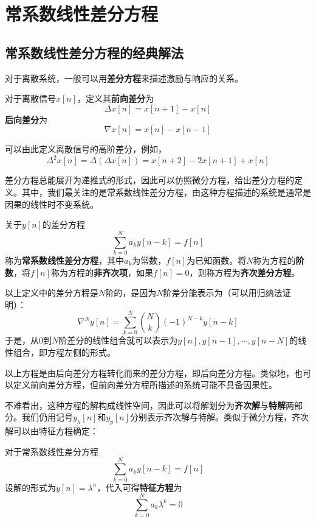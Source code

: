 \section{常系数线性差分方程}

\subsection{常系数线性差分方程的经典解法}\label{sub:difference_equation}

对于离散系统，一般可以用\textbf{差分方程}来描述激励与响应的关系。

\begin{definition}[差分]
    对于离散信号$x[n]$，定义其\textbf{前向差分}为
    $$\Delta x[n]=x[n+1]-x[n]$$
    \textbf{后向差分}为
    $$\nabla x[n]=x[n]-x[n-1]$$
\end{definition}

可以由此定义离散信号的高阶差分，例如，
$$\Delta^2 x[n]=\Delta(\Delta x[n])=x[n+2]-2x[n+1]+x[n]$$

差分方程总能展开为递推式的形式，因此可以仿照微分方程，给出差分方程的定义。其中，我们最关注的是常系数线性差分方程，由这种方程描述的系统是通常是因果的线性时不变系统。
\begin{definition}[常系数线性差分方程]
    关于$y[n]$的差分方程
    $$\sum_{k=0}^{N}a_k y[n-k] = f[n]$$
    称为\textbf{常系数线性差分方程}，其中$a_k$为常数，$f[n]$为已知函数。将$N$称为方程的\textbf{阶数}，将$f[n]$称为方程的\textbf{非齐次项}，如果$f[n]=0$，则称方程为\textbf{齐次差分方程}。
\end{definition}

以上定义中的差分方程是$N$阶的，是因为$N$阶差分能表示为（可以用归纳法证明）：
$$\nabla^N y[n]=\sum_{k=0}^{N}\binom{N}{k}(-1)^{N-k}y[n-k]$$
于是，从$0$到$N$阶差分的线性组合就可以表示为$y[n],y[n-1],\cdots,y[n-N]$的线性组合，即方程左侧的形式。

以上方程是由后向差分方程转化而来的差分方程，即后向差分方程。类似地，也可以定义前向差分方程，但前向差分方程所描述的系统可能不具备因果性。

不难看出，这种方程的解构成线性空间，因此可以将解划分为\textbf{齐次解}与\textbf{特解}两部分。我们仍用记号$y_h[n]$和$y_p[n]$分别表示齐次解与特解。类似于微分方程，齐次解可以由特征方程确定：
\begin{definition}[常系数线性差分方程的特征方程]
    对于常系数线性差分方程
    $$\sum_{k=0}^{N}a_k y[n-k] = f[n]$$
    设解的形式为$y[n]=\lambda^n$，代入可得\textbf{特征方程}为
    $$\sum_{k=0}^{N}a_k \lambda^k = 0$$
\end{definition}

